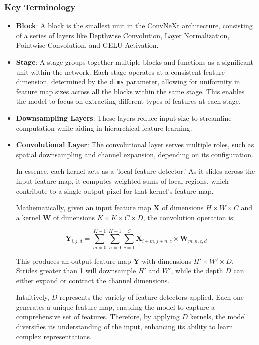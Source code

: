 \documentclass[a4paper,12pt,openright]{book}
\begin{document}
\subsubsection{Key Terminology}
\begin{itemize}
    \item \textbf{Block}: A block is the smallest unit in the ConvNeXt architecture, consisting of a series of layers like Depthwise Convolution, Layer Normalization, Pointwise Convolution, and GELU Activation.
    \item \textbf{Stage}: A stage groups together multiple blocks and functions as a significant unit within the network. Each stage operates at a consistent feature dimension, determined by the \texttt{dims} parameter, allowing for uniformity in feature map sizes across all the blocks within the same stage. This enables the model to focus on extracting different types of features at each stage.
    \item \textbf{Downsampling Layers}: These layers reduce input size to streamline computation while aiding in hierarchical feature learning.
   \item \textbf{Convolutional Layer}:
The convolutional layer serves multiple roles, such as spatial downsampling and channel expansion, depending on its configuration. 

In essence, each kernel acts as a 'local feature detector.' As it slides across the input feature map, it computes weighted sums of local regions, which contribute to a single output pixel for that kernel's feature map.

Mathematically, given an input feature map \( \mathbf{X} \) of dimensions \( H \times W \times C \) and a kernel \( \mathbf{W} \) of dimensions \( K \times K \times C \times D \), the convolution operation is:

\[
\mathbf{Y}_{i,j,d} = \sum_{m=0}^{K-1} \sum_{n=0}^{K-1} \sum_{c=1}^{C} \mathbf{X}_{i+m,j+n,c} \times \mathbf{W}_{m,n,c,d}
\]

This produces an output feature map \( \mathbf{Y} \) with dimensions \( H' \times W' \times D \). Strides greater than 1 will downsample \( H' \) and \( W' \), while the depth \( D \) can either expand or contract the channel dimensions.

Intuitively, \( D \) represents the variety of feature detectors applied. Each one generates a unique feature map, enabling the model to capture a comprehensive set of features. Therefore, by applying \( D \) kernels, the model diversifies its understanding of the input, enhancing its ability to learn complex representations.


\end{itemize}
\end{document}
